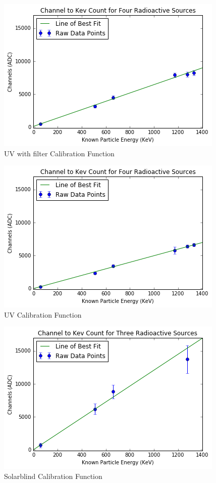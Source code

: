\documentclass[aip, jmp, amsmath, amssymb, reprint, floatfix]{revtex4-1}
\begin{document}
\begin{figure}[h]
  \centering
    \includegraphics[width=.8\columnwidth]{chanf.png}
  \caption{UV with filter Calibration Function}
  \label{fig:chanf}
\end{figure} 

\begin{figure}[h]
  \centering
    \includegraphics[width=.8\columnwidth]{chanuv.png}
  \caption{UV Calibration Function}
  \label{fig:chanuv}
\end{figure} 

\begin{figure}[h]
  \centering
    \includegraphics[width=.8\columnwidth]{chansb.png}
  \caption{Solarblind Calibration Function}
  \label{fig:chansb}
\end{figure} 
\end{document}
